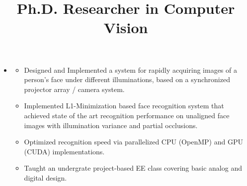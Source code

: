 \documentclass[line,lm,rm,11pt]{res} %
\begin{document}
\begin{resume}
\begin{itemize}
\begin{position}
\begin{itemize}
	\end{itemize}
	\end{position}
\item
	\title{{\bf Ph.D. Researcher in Computer Vision}}
	\begin{position}
	\vspace{-2mm}
	\begin{itemize}
		\item Designed and Implemented a system for rapidly acquiring images of a person's face under different illuminations, based on a synchronized projector array / camera system.
		\item Implemented L1-Minimization based face recognition system that achieved state of the art recognition performance on unaligned face images with illumination variance and partial occlusions.
		\item Optimized recognition speed via parallelized CPU (OpenMP) and GPU (CUDA) implementations.
		\item Taught an undergrate project-based EE class covering basic analog and digital design.
	\end{itemize}
	\end{position}
\end{itemize}


\end{resume}
\end{document}
